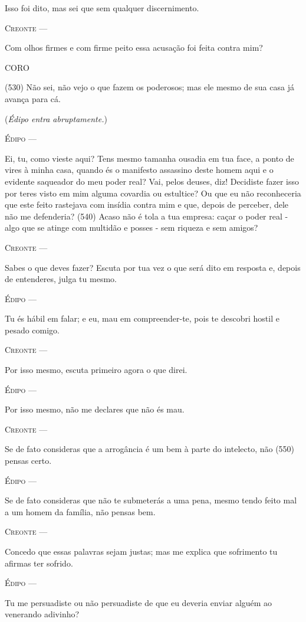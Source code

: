 Isso foi dito, mas sei que sem qualquer discernimento.

\textsc{Creonte} ---

Com olhos firmes e com firme peito essa acusação foi feita contra mim?

\textsc{CORO}

(530) Não sei, não vejo o que fazem os poderosos; mas ele mesmo de sua
casa já avança para cá.

(\emph{Édipo entra abruptamente.})

\textsc{Édipo} ---

Ei, tu, como vieste aqui? Tens mesmo tamanha ousadia em tua face, a
ponto de vires à minha casa, quando és o manifesto assassino deste homem
aqui e o evidente saqueador do meu poder real? Vai, pelos deuses, diz!
Decidiste fazer isso por teres visto em mim alguma covardia ou
estultice? Ou que eu não reconheceria que este feito rastejava com
insídia contra mim e que, depois de perceber, dele não me defenderia?
(540) Acaso não é tola a tua empresa: caçar o poder real - algo que se
atinge com multidão e posses - sem riqueza e sem amigos?

\textsc{Creonte} ---

Sabes o que deves fazer? Escuta por tua vez o que será dito em resposta
e, depois de entenderes, julga tu mesmo.

\textsc{Édipo} ---

Tu és hábil em falar; e eu, mau em compreender-te, pois te descobri
hostil e pesado comigo.

\textsc{Creonte} ---

Por isso mesmo, escuta primeiro agora o que direi.

\textsc{Édipo} ---

Por isso mesmo, não me declares que não és mau.

\textsc{Creonte} ---

Se de fato consideras que a arrogância é um bem à parte do intelecto,
não (550) pensas certo.

\textsc{Édipo} ---

Se de fato consideras que não te submeterás a uma pena, mesmo tendo
feito mal a um homem da família, não pensas bem.

\textsc{Creonte} ---

Concedo que essas palavras sejam justas; mas me explica que sofrimento
tu afirmas ter sofrido.

\textsc{Édipo} ---

Tu me persuadiste ou não persuadiste de que eu deveria enviar alguém ao
venerando adivinho?

